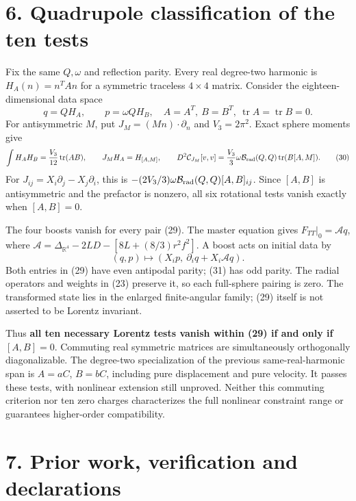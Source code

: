 \documentclass[
  10pt,
]{article}
\begin{document}
\section{6. Quadrupole classification of the ten
tests}\label{quadrupole-classification-of-the-ten-tests}

Fix the same \(Q,\omega\) and reflection parity. Every real degree-two
harmonic is \(H_A(n)=n^TAn\) for a symmetric traceless \(4\times4\)
matrix. Consider the eighteen-dimensional data space \[
 q=QH_A,\qquad p=\omega QH_B,
 \quad A=A^T,\ B=B^T,\ \operatorname{tr}A=\operatorname{tr}B=0.
                                                               \tag{29}
\] For antisymmetric \(M\), put \(J_M=(Mn)\cdot\partial_n\) and
\(V_3=2\pi^2\). Exact sphere moments give \[
 \int H_AH_B=\frac{V_3}{12}\operatorname{tr}(AB),\qquad
 J_MH_A=H_{[A,M]},\qquad
 D^2\mathcal C_{J_M}[v,v]
 =\frac{V_3}{3}\omega\mathcal B_{\rm rad}(Q,Q)
                        \operatorname{tr}(B[A,M]).      \tag{30}
\] For \(J_{ij}=X_i\partial_j-X_j\partial_i\), this is
\(-(2V_3/3)\omega\mathcal B_{\rm rad}(Q,Q)[A,B]_{ij}\). Since \([A,B]\)
is antisymmetric and the prefactor is nonzero, all six rotational tests
vanish exactly when \([A,B]=0\).

The four boosts vanish for every pair (29). The master equation gives
\(F_{TT}|_0=\mathcal A q\), where
\(\mathcal A=\Delta_{\mathbb R^4}-2L D-[8L+(8/3)r^2f^2]\). A boost acts
on initial data by \[
 (q,p)\longmapsto (X_i p,\ \partial_iq+X_i\mathcal A q). \tag{31}
\] Both entries in (29) have even antipodal parity; (31) has odd parity.
The radial operators and weights in (23) preserve it, so each
full-sphere pairing is zero. The transformed state lies in the enlarged
finite-angular family; (29) itself is not asserted to be Lorentz
invariant.

Thus \textbf{all ten necessary Lorentz tests vanish within (29) if and
only if \([A,B]=0\)}. Commuting real symmetric matrices are
simultaneously orthogonally diagonalizable. The degree-two
specialization of the previous same-real-harmonic span is \(A=aC\),
\(B=bC\), including pure displacement and pure velocity. It passes these
tests, with nonlinear extension still unproved. Neither this commuting
criterion nor ten zero charges characterizes the full nonlinear
constraint range or guarantees higher-order compatibility.

\section{7. Prior work, verification and
declarations}\label{prior-work-verification-and-declarations}
\end{document}
